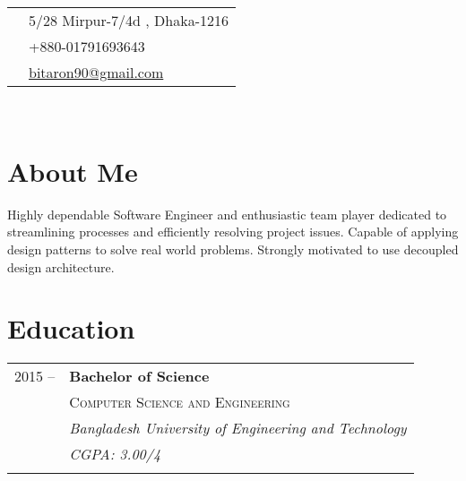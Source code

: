 \documentclass[10pt]{article} %
\begin{document}
{\begin{minipage}[t]{0.44\textwidth}

\colorbox{shade}{\textcolor{text1}{
\begin{tabular}{c|p{7cm}}
\raisebox{-4pt}{\textifsymbol{18}} & 5/28 Mirpur-7/4d , Dhaka-1216 \\ %
\raisebox{-3pt}{\Mobilefone} & +880-01791693643 \\ %
\raisebox{-1pt}{\Letter} & \href{mailto:bitaron90@gmail.com}{bitaron90@gmail.com} \\ %
\end{tabular}
}
}\\[10pt]


\section{About Me}
\normalsize{Highly dependable Software Engineer and enthusiastic team player dedicated to streamlining processes and efficiently resolving project issues. Capable of applying design patterns to solve real world problems. Strongly motivated to use decoupled design architecture.}\\

\section{Education} 

\begin{tabular}{rl} %


2015 --  & \textbf{Bachelor of Science} \\ 
& \textsc{Computer Science and Engineering} \\ 
& \textit{Bangladesh University of Engineering and Technology}\\
& \textit{CGPA: 3.00/4}\\
&\\
	 


\end{tabular}
\end{minipage}}
\end{document}
